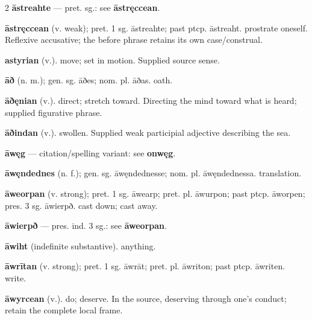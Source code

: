 \begin{multicols*}{2}
\textbf{āstreahte} — pret. sg.: see \textbf{āstręccean}.\par
\textbf{āstręccean} (v. weak); pret. 1 sg. āstreahte; past ptcp. āstreaht. prostrate oneself. Reflexive accusative; the before phrase retains its own case/construal.\par
\textbf{astyrian} (v.). move; set in motion. Supplied source sense.\par
\textbf{āð} (n. m.); gen. sg. āðes; nom. pl. āðas. oath.\par
\textbf{āðęnian} (v.). direct; stretch toward. Directing the mind toward what is heard; supplied figurative phrase.\par
\textbf{āðindan} (v.). swollen. Supplied weak participial adjective describing the sea.\par
\textbf{āwęg} — citation/spelling variant: see \textbf{onwęg}.\par
\textbf{āwęndednes} (n. f.); gen. sg. āwęndednesse; nom. pl. āwęndednessa. translation.\par
\textbf{āweorpan} (v. strong); pret. 1 sg. āwearp; pret. pl. āwurpon; past ptcp. āworpen; pres. 3 sg. āwierpð. cast down; cast away.\par
\textbf{āwierpð} — pres. ind. 3 sg.: see \textbf{āweorpan}.\par
\textbf{āwiht} (indefinite substantive). anything.\par
\textbf{āwrītan} (v. strong); pret. 1 sg. āwrāt; pret. pl. āwriton; past ptcp. āwriten. write.\par
\textbf{āwyrcean} (v.). do; deserve. In the source, deserving through one's conduct; retain the complete local frame.\par

\end{multicols*}
